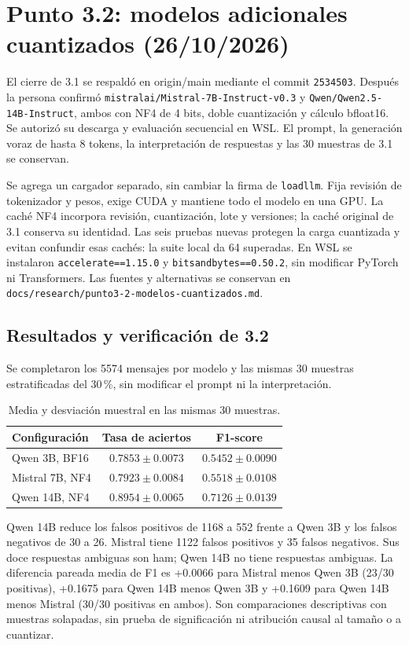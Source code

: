 \documentclass[11pt,letterpaper]{article}
\renewcommand{\_}{\originalunderscore\allowbreak}
\begin{document}
\section{Punto 3.2: modelos adicionales cuantizados (26/10/2026)}
El cierre de 3.1 se respaldó en origin/main mediante el commit
\texttt{2534503}. Después la persona confirmó
\texttt{mistralai/Mistral-7B-Instruct-v0.3} y
\texttt{Qwen/Qwen2.5-14B-Instruct}, ambos con NF4 de 4 bits, doble
cuantización y cálculo bfloat16. Se autorizó su descarga y evaluación
secuencial en WSL. El prompt, la generación voraz de hasta 8 tokens, la
interpretación de respuestas y las 30 muestras de 3.1 se conservan.

Se agrega un cargador separado, sin cambiar la firma de \texttt{load\_llm}.
Fija revisión de tokenizador y pesos, exige CUDA y mantiene todo el modelo
en una GPU. La caché NF4 incorpora revisión, cuantización, lote y versiones;
la caché original de 3.1 conserva su identidad. Las seis pruebas nuevas
protegen la carga cuantizada y evitan confundir esas cachés: la suite local
da 64 superadas. En WSL se instalaron \texttt{accelerate==1.15.0} y
\texttt{bitsandbytes==0.50.2}, sin modificar PyTorch ni Transformers.
Las fuentes y alternativas se conservan en
\texttt{docs/research/punto3-2-modelos-cuantizados.md}.

\subsection{Resultados y verificación de 3.2}
Se completaron los 5574 mensajes por modelo y las mismas 30 muestras
estratificadas del 30\,\%, sin modificar el prompt ni la interpretación.

\begin{table}[H]
\centering
\begin{tabular}{lcc}
\toprule
Configuración & Tasa de aciertos & F1-score\\
\midrule
Qwen 3B, BF16 & $0.7853\pm0.0073$ & $0.5452\pm0.0090$\\
Mistral 7B, NF4 & $0.7923\pm0.0084$ & $0.5518\pm0.0108$\\
Qwen 14B, NF4 & $0.8954\pm0.0065$ & $0.7126\pm0.0139$\\
\bottomrule
\end{tabular}
\caption{Media y desviación muestral en las mismas 30 muestras.}
\end{table}

Qwen 14B reduce los falsos positivos de 1168 a 552 frente a Qwen 3B y
los falsos negativos de 30 a 26. Mistral tiene 1122 falsos positivos y
35 falsos negativos. Sus doce respuestas ambiguas son ham; Qwen 14B no
tiene respuestas ambiguas. La diferencia pareada media de F1 es +0.0066
para Mistral menos Qwen 3B (23/30 positivas), +0.1675 para Qwen 14B menos
Qwen 3B y +0.1609 para Qwen 14B menos Mistral (30/30 positivas en ambos).
Son comparaciones descriptivas con muestras solapadas, sin prueba de
significación ni atribución causal al tamaño o a cuantizar.
\end{document}
